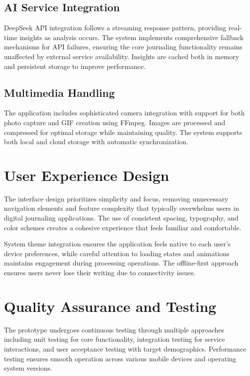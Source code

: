 \subsection{AI Service Integration}

DeepSeek API integration follows a streaming response pattern, providing real-time insights as analysis occurs. The system implements comprehensive fallback mechanisms for API failures, ensuring the core journaling functionality remains unaffected by external service availability. Insights are cached both in memory and persistent storage to improve performance.

\subsection{Multimedia Handling}

The application includes sophisticated camera integration with support for both photo capture and GIF creation using FFmpeg. Images are processed and compressed for optimal storage while maintaining quality. The system supports both local and cloud storage with automatic synchronization.

\section{User Experience Design}

The interface design prioritizes simplicity and focus, removing unnecessary navigation elements and feature complexity that typically overwhelms users in digital journaling applications. The use of consistent spacing, typography, and color schemes creates a cohesive experience that feels familiar and comfortable.

System theme integration ensures the application feels native to each user's device preferences, while careful attention to loading states and animations maintains engagement during processing operations. The offline-first approach ensures users never lose their writing due to connectivity issues.

\section{Quality Assurance and Testing}

The prototype undergoes continuous testing through multiple approaches including unit testing for core functionality, integration testing for service interactions, and user acceptance testing with target demographics. Performance testing ensures smooth operation across various mobile devices and operating system versions.

